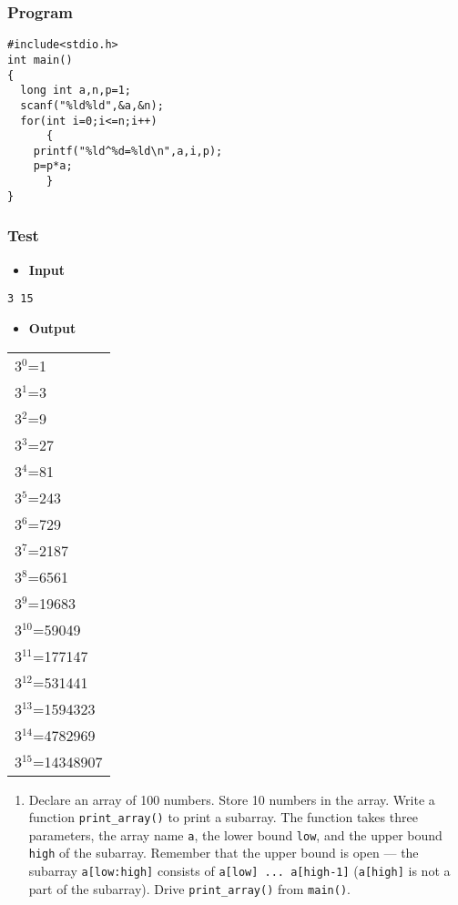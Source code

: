 \documentclass[11pt]{article}
\begin{document}
\subsubsection*{Program}
\label{sec-1-5-1}
\begin{verbatim}
#include<stdio.h>
int main()
{
  long int a,n,p=1;
  scanf("%ld%ld",&a,&n);
  for(int i=0;i<=n;i++)
      {
	printf("%ld^%d=%ld\n",a,i,p);
	p=p*a;
      }
}
\end{verbatim}
\subsubsection*{Test}
\label{sec-1-5-2}
\begin{itemize}
\item \textbf{Input}
\end{itemize}
\begin{verbatim}
3 15
\end{verbatim}
\begin{itemize}
\item \textbf{Output}
\end{itemize}
\begin{center}
\begin{tabular}{l}
3$^{\text{0}}$=1\\
3$^{\text{1}}$=3\\
3$^{\text{2}}$=9\\
3$^{\text{3}}$=27\\
3$^{\text{4}}$=81\\
3$^{\text{5}}$=243\\
3$^{\text{6}}$=729\\
3$^{\text{7}}$=2187\\
3$^{\text{8}}$=6561\\
3$^{\text{9}}$=19683\\
3$^{\text{10}}$=59049\\
3$^{\text{11}}$=177147\\
3$^{\text{12}}$=531441\\
3$^{\text{13}}$=1594323\\
3$^{\text{14}}$=4782969\\
3$^{\text{15}}$=14348907\\
\end{tabular}
\end{center}

\begin{enumerate}
\item Declare an array of 100 numbers.  Store 10 numbers in the
array. Write a function \texttt{print\_array()} to print a
subarray. The function takes three parameters, the array name
\texttt{a}, the lower bound \texttt{low}, and the upper bound \texttt{high} of the
subarray. Remember that the upper bound is open --- the
subarray \texttt{a[low:high]} consists of \texttt{a[low] ... a[high-1]}
(\texttt{a[high]} is not a part of the subarray). Drive
\texttt{print\_array()} from \texttt{main()}.
\end{enumerate}
\end{document}
